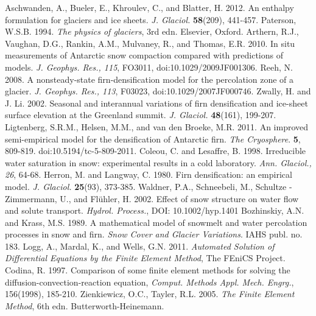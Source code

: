\documentclass{article}%
\begin{document}
\newpage
\begin{thebibliography}{1}

  Aschwanden, A., Bueler, E., Khroulev, C., and Blatter, H. 2012. An enthalpy formulation for glaciers and ice sheets. \textit{J. Glaciol.} \textbf{58}(209), 441\mbox{-}457.
  Paterson, W.S.B. 1994. \textit{The physics of glaciers}, 3rd edn. Elsevier, Oxford.
  Arthern, R.J., Vaughan, D.G., Rankin, A.M., Mulvaney, R., and Thomas, E.R. 2010. In situ measurements of Antarctic snow compaction compared with predictions of models. \textit{J. Geophys. Res., 115}, FO3011, doi:10.1029/2009JF001306.
  Reeh, N. 2008. A nonsteady\mbox{-}state firn\mbox{-}densification model for the percolation zone of a glacier. \textit{J. Geophys. Res., 113}, F03023, doi:10.1029/2007JF000746.
  Zwally, H. and J. Li. 2002. Seasonal and interannual variations of firn densification and ice\mbox{-}sheet surface elevation at the Greenland summit. \textit{J. Glaciol.} \textbf{48}(161), 199\mbox{-}207.
  Ligtenberg, S.R.M., Helsen, M.M., and van den Broeke, M.R. 2011. An improved semi\mbox{-}empirical model for the densification of Antarctic firn. \textit{The Cryosphere}. \textbf{5}, 809\mbox{-}819. doi:10.5194/tc\mbox{-}5\mbox{-}809\mbox{-}2011.
  \bibitem{}Coleou, C. and Lesaffre, B. 1998. Irreducible water saturation in snow: experimental results in a cold laboratory. \textit{Ann. Glaciol., 26}, 64\mbox{-}68.
  Herron, M. and Langway, C. 1980. Firn densification: an empirical model. \textit{J. Glaciol.} \textbf{25}(93), 373\mbox{-}385.
  Waldner, P.A., Schneebeli, M., Schultze \mbox{-} Zimmermann, U., and Fl\"{u}hler, H. 2002. Effect of snow structure on water flow and solute transport. \textit{Hydrol. Process.}, DOI: 10.1002/hyp.1401
  Bozhinskiy, A.N. and Krass, M.S. 1989. A mathematical model of snowmelt and water percolation processes in snow and firn. \textit{Snow Cover and Glacier Variations}. IAHS publ. no. 183.
  Logg, A., Mardal, K., and Wells, G.N. 2011. \textit{Automated Solution of Differential Equations by the Finite Element Method}, The FEniCS Project.
  Codina, R. 1997. Comparison of some finite element methods for solving the diffusion\mbox{-}convection\mbox{-}reaction equation, \textit{Comput. Methods Appl. Mech. Engrg.}, 156(1998), 185\mbox{-}210.
  Zienkiewicz, O.C., Tayler, R.L. 2005. \textit{The Finite Element Method}, 6th edn. Butterworth\mbox{-}Heinemann.
\end{thebibliography}
\end{document}
